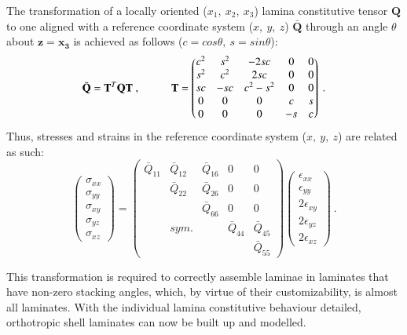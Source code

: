 The transformation of a locally oriented ($x_1,\ x_2,\ x_3$) lamina constitutive tensor $\mathbf{Q}$ to one aligned with a reference coordinate system ($x,\ y,\ z$) $\bar{\mathbf{Q}}$ through an angle $\theta$ about $\mathbf{z}=\mathbf{x_3}$ is achieved as follows ($c = cos\theta,\ s = sin\theta$):
\begin{equation} 
\bar{\mathbf{Q}} = \mathbf{T}^T \mathbf{Q} \mathbf{T}\ ,
\hspace{10mm}
\mathbf{T} =
\begin{pmatrix}
c^2 & s^2 & -2sc & 0 & 0 \\
s^2 & c^2 & 2sc & 0 & 0 \\
sc & -sc & c^2 - s^2 & 0 & 0 \\
0 & 0 & 0 & c & s \\
 0 & 0 & 0 & -s & c
\end{pmatrix}
\label{eqscomp11}\ .
\end{equation}
Thus, stresses and strains in the reference coordinate system  ($x,\ y,\ z$) are related as such:
\begin{equation} 
\begin{pmatrix}
\sigma_{xx} \\
\sigma_{yy} \\
\sigma_{xy} \\
\sigma_{yz} \\
\sigma_{xz} 
\end{pmatrix}
=
\begin{pmatrix}
\bar{Q}_{11} & \bar{Q}_{12} &  \bar{Q}_{16} & 0 & 0 \\
\  & \bar{Q}_{22} &  \bar{Q}_{26} & 0 & 0 \\
\  & \  & \bar{Q}_{66}  & 0 & 0 \\
\  & sym. & \  & \bar{Q}_{44} & \bar{Q}_{45} \\
\  & \  & \  & \ & \bar{Q}_{55}
\end{pmatrix}
\begin{pmatrix}
\epsilon_{xx} \\
\epsilon_{yy} \\
2\epsilon_{xy}\\
2\epsilon_{yz} \\
2\epsilon_{xz}
\end{pmatrix}
\label{eqscomp_plane_stress_tensor_rotated}\ .
\end{equation}

This transformation is required to correctly assemble laminae in laminates that have non-zero stacking angles, which, by virtue of their customizability, is almost all laminates. With the individual lamina constitutive behaviour detailed, orthotropic shell laminates can now be built up and modelled.

